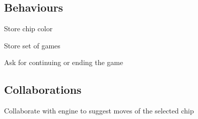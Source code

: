 \documentclass{report}
\begin{document}
\subsection{Behaviours}

    \begin{dashed}
        \item Store chip color
        \item Store set of games
        \item Ask for continuing or ending the game
    \end{dashed}

\subsection{Collaborations}

    \begin{dashed}
        \item Collaborate with engine to suggest moves of the selected chip
    \end{dashed}
\end{document}
